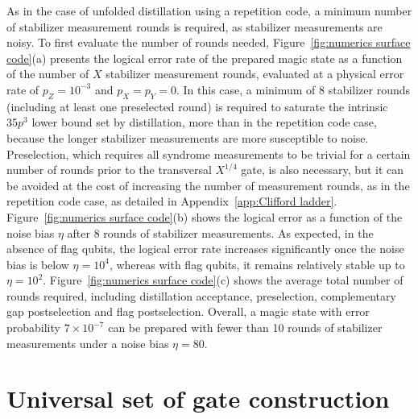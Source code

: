 \documentclass[%
 reprint,
superscriptaddress,
 amsmath,amssymb,
 aps,
]{revtex4-2}
\begin{document}
As in the case of unfolded distillation using a repetition code, a minimum number of stabilizer measurement rounds is required, as stabilizer measurements are noisy. To first evaluate the number of rounds needed, Figure~\ref{fig:numerics surface code}(a) presents the logical error rate of the prepared magic state as a function of the number of $X$ stabilizer measurement rounds, evaluated at a physical error rate of $p_Z = 10^{-3}$ and $p_X = p_Y = 0$. In this case, a minimum of 8 stabilizer rounds (including at least one preselected round) is required to saturate the intrinsic $35p^3$ lower bound set by distillation, more than in the repetition code case, because the longer stabilizer measurements are more susceptible to noise. Preselection, which requires all syndrome measurements to be trivial for a certain number of rounds prior to the transversal $X^{1/4}$ gate, is also necessary, but it can be avoided at the cost of increasing the number of measurement rounds, as in the repetition code case, as detailed in Appendix~\ref{app:Clifford ladder}. Figure~\ref{fig:numerics surface code}(b) shows the logical error as a function of the noise bias $\eta$ after 8 rounds of stabilizer measurements. As expected, in the absence of flag qubits, the logical error rate increases significantly once the noise bias is below $\eta = 10^4$, whereas with flag qubits, it remains relatively stable up to $\eta = 10^2$. Figure~\ref{fig:numerics surface code}(c) shows the average total number of rounds required, including distillation acceptance, preselection, complementary gap postselection and flag postselection. Overall, a magic state with error probability $7 \times 10^{-7}$ can be prepared with fewer than 10 rounds of stabilizer measurements under a noise bias $\eta = 80$. 

\section{Universal set of gate construction}
\label{sec:universal}
\end{document}
